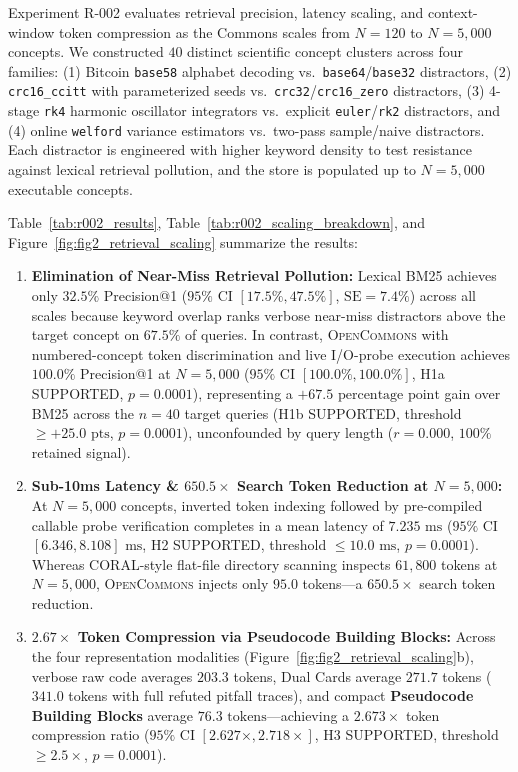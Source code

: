 \documentclass[10pt,twocolumn]{article}
\begin{document}
Experiment R-002 evaluates retrieval precision, latency scaling, and context-window token compression as the Commons scales from $N=120$ to $N=5{,}000$ concepts. We constructed $40$ distinct scientific concept clusters across four families: (1) Bitcoin \texttt{base58} alphabet decoding vs.\ \texttt{base64}/\texttt{base32} distractors, (2) \texttt{crc16\_ccitt} with parameterized seeds vs.\ \texttt{crc32}/\texttt{crc16\_zero} distractors, (3) 4-stage \texttt{rk4} harmonic oscillator integrators vs.\ explicit \texttt{euler}/\texttt{rk2} distractors, and (4) online \texttt{welford} variance estimators vs.\ two-pass sample/naive distractors. Each distractor is engineered with higher keyword density to test resistance against lexical retrieval pollution, and the store is populated up to $N=5{,}000$ executable concepts.

Table~\ref{tab:r002_results}, Table~\ref{tab:r002_scaling_breakdown}, and Figure~\ref{fig:fig2_retrieval_scaling} summarize the results:
\begin{enumerate}
    \item \textbf{Elimination of Near-Miss Retrieval Pollution:} Lexical BM25 achieves only $32.5\%$ Precision@1 ($95\%$ CI $[17.5\%, 47.5\%]$, $\text{SE} = 7.4\%$) across all scales because keyword overlap ranks verbose near-miss distractors above the target concept on $67.5\%$ of queries. In contrast, \textsc{OpenCommons} with numbered-concept token discrimination and live I/O-probe execution achieves $100.0\%$ Precision@1 at $N=5{,}000$ ($95\%$ CI $[100.0\%, 100.0\%]$, H1a SUPPORTED, $p = 0.0001$), representing a $+67.5\text{ percentage point}$ gain over BM25 across the $n=40$ target queries (H1b SUPPORTED, threshold $\ge +25.0\text{ pts}$, $p = 0.0001$), unconfounded by query length ($r = 0.000$, $100\%$ retained signal).
    \item \textbf{Sub-10ms Latency \& $650.5\times$ Search Token Reduction at $N=5{,}000$:} At $N=5{,}000$ concepts, inverted token indexing followed by pre-compiled callable probe verification completes in a mean latency of $7.235\text{ ms}$ ($95\%$ CI $[6.346, 8.108]\text{ ms}$, H2 SUPPORTED, threshold $\le 10.0\text{ ms}$, $p = 0.0001$). Whereas \textsc{CORAL}-style flat-file directory scanning inspects $61{,}800$ tokens at $N=5{,}000$, \textsc{OpenCommons} injects only $95.0$ tokens—a $650.5\times$ search token reduction.
    \item \textbf{$2.67\times$ Token Compression via Pseudocode Building Blocks:} Across the four representation modalities (Figure~\ref{fig:fig2_retrieval_scaling}b), verbose raw code averages $203.3$ tokens, Dual Cards average $271.7$ tokens ($341.0$ tokens with full refuted pitfall traces), and compact \textbf{Pseudocode Building Blocks} average $76.3\text{ tokens}$—achieving a $2.673\times$ token compression ratio ($95\%$ CI $[2.627\times, 2.718\times]$, H3 SUPPORTED, threshold $\ge 2.5\times$, $p = 0.0001$).
\end{enumerate}
\end{document}

